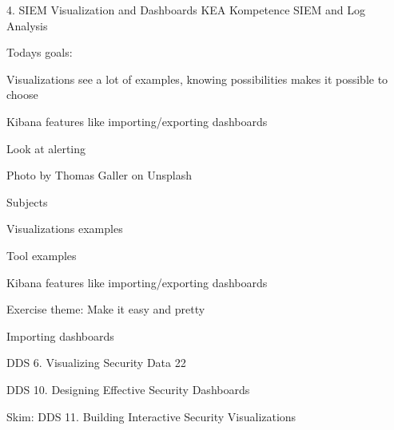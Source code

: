 \documentclass[Screen16to9,17pt]{foils}
\begin{document}
\mytitlepage
{4. SIEM Visualization and Dashboards}
{KEA Kompetence SIEM and Log Analysis}




Todays goals:
\begin{list2}
\item Visualizations see a lot of examples, knowing possibilities makes it possible to choose
\item Kibana features like importing/exporting dashboards
\item Look at alerting
\end{list2}

Photo by Thomas Galler on Unsplash



\begin{list1}
\item Subjects
\begin{list2}
\item Visualizations examples
\item Tool examples
\item Kibana features like importing/exporting dashboards
\end{list2}
\item Exercise theme: Make it easy and pretty
\begin{list2}
\item Importing dashboards
\end{list2}
\end{list1}


\begin{list1}
\item DDS 6. Visualizing Security Data 22
\item DDS 10. Designing Effective Security Dashboards
\item Skim: DDS 11. Building Interactive Security Visualizations
\end{list1}




\end{document}
